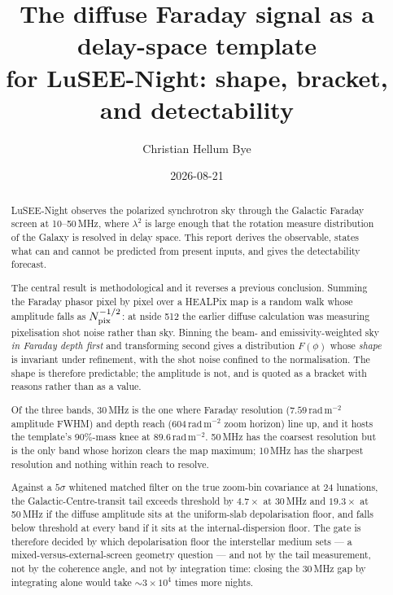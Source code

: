 \documentclass[11pt]{article}
\title{The diffuse Faraday signal as a delay-space template\\
  for LuSEE-Night: shape, bracket, and detectability}
\author{Christian Hellum Bye}
\date{2026-08-21}
\newcommand{\rmu}{\ensuremath{\mathrm{rad\,m^{-2}}}}
\newcommand{\lamsq}{\ensuremath{\lambda^{2}}}
\begin{document}
\maketitle

\begin{abstract}
\noindent
LuSEE-Night observes the polarized synchrotron sky through the Galactic
Faraday screen at 10--50\,MHz, where \lamsq{} is large enough that the
rotation measure distribution of the Galaxy is resolved in delay space.
This report derives the observable, states what can and cannot be
predicted from present inputs, and gives the detectability forecast.

The central result is methodological and it reverses a previous
conclusion. Summing the Faraday phasor pixel by pixel over a HEALPix map
is a random walk whose amplitude falls as $N_{\rm pix}^{-1/2}$: at
nside 512 the earlier diffuse calculation was measuring pixelisation
shot noise rather than sky. Binning the beam- and emissivity-weighted
sky \emph{in Faraday depth first} and transforming second gives a
distribution $F(\phi)$ whose \emph{shape} is invariant under refinement,
with the shot noise confined to the normalisation. The shape is
therefore predictable; the amplitude is not, and is quoted as a bracket
with reasons rather than as a value.

Of the three bands, 30\,MHz is the one where Faraday resolution
($7.59$\,\rmu{} amplitude FWHM) and depth reach ($604$\,\rmu{} zoom
horizon) line up, and it hosts the template's 90\%-mass knee at
$89.6$\,\rmu. 50\,MHz has the coarsest resolution but is the only band
whose horizon clears the map maximum; 10\,MHz has the sharpest
resolution and nothing within reach to resolve.

Against a $5\sigma$ whitened matched filter on the true zoom-bin
covariance at 24 lunations, the Galactic-Centre-transit tail exceeds
threshold by $4.7\times$ at 30\,MHz and $19.3\times$ at 50\,MHz if the
diffuse amplitude sits at the uniform-slab depolarisation floor, and
falls below threshold at every band if it sits at the internal-dispersion
floor. The gate is therefore decided by which depolarisation floor the
interstellar medium sets --- a mixed-versus-external-screen geometry
question --- and not by the tail measurement, not by the coherence angle,
and not by integration time: closing the 30\,MHz gap by integrating
alone would take $\sim\!3\times10^{4}$ times more nights.
\end{abstract}

\tableofcontents
\end{document}
